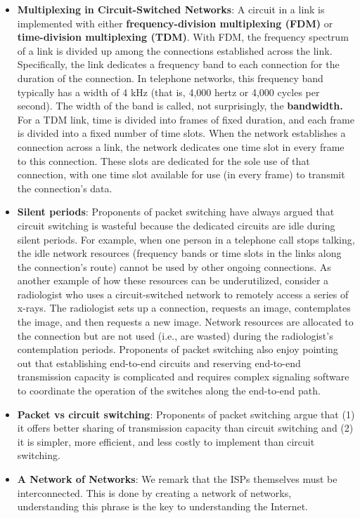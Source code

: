 \documentclass{report}
\begin{document}
\begin{itemize}
        \item \textbf{Multiplexing in Circuit-Switched Networks}: A circuit in a link is implemented with either \textbf{frequency-division multiplexing (FDM)} or \textbf{time-division multiplexing (TDM)}. With FDM, the frequency spectrum of a link is divided up among the connections established across the link. Specifically, the link dedicates a frequency band to each connection for the duration of the connection. In telephone networks, this frequency band typically has a width of 4 kHz (that is, 4,000 hertz or 4,000 cycles per second). The width of the band is called, not surprisingly, the \textbf{bandwidth.}
            \bigbreak \noindent 
            For a TDM link, time is divided into frames of fixed duration, and each frame is divided into a fixed number of time slots. When the network establishes a connection across a link, the network dedicates one time slot in every frame to this connection. These slots are dedicated for the sole use of that connection, with one time slot available for use (in every frame) to transmit the connection’s data.
        \item \textbf{Silent periods}: Proponents of packet switching have always argued that circuit switching is wasteful because the dedicated circuits are idle during silent periods. For example, when one person in a telephone call stops talking, the idle network resources (frequency bands or time slots in the links along the connection’s route) cannot be used by other ongoing connections. As another example of how these resources can be underutilized, consider a radiologist who uses a circuit-switched network to remotely access a series of x-rays. The radiologist sets up a connection, requests an image, contemplates the image, and then requests a new image. Network resources are allocated to the connection but are not used (i.e., are wasted) during the radiologist’s contemplation periods. Proponents of packet switching also enjoy pointing out that establishing end-to-end circuits and reserving end-to-end transmission capacity is complicated and requires complex signaling software to coordinate the operation of the switches along the end-to-end path.
        \item \textbf{Packet vs circuit switching}: Proponents of packet switching argue that (1) it offers better sharing of transmission capacity than circuit switching and (2) it is simpler, more efficient, and less costly to implement than circuit switching. 
        \item \textbf{A Network of Networks}: We remark that the ISPs themselves must be interconnected. This is done by creating a network of networks, understanding this phrase is the key to understanding the Internet.

\end{itemize}
\end{document}
